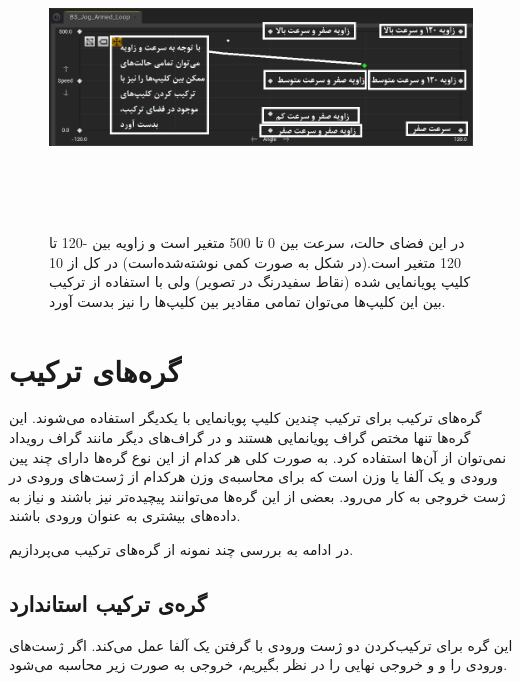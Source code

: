 \begin{figure}[ht]
	\centerline{\includegraphics[width=\textwidth,height=8cm,keepaspectratio]{Figures/Ch3/BlendSpace.png}}

	\caption{در این فضای حالت، سرعت بین 0 تا 500 متغیر است و زاویه بین -120 تا 120 متغیر است.(در شکل به صورت کمی نوشته‌شده‌است)
	در کل از 10 کلیپ پویانمایی شده (نقاط سفیدرنگ در تصویر) ولی با استفاده از ترکیب بین این کلیپ‌ها می‌توان تمامی مقادیر بین کلیپ‌ها را نیز بدست آورد. }
	\label{fig:BlendSpace}
\end{figure}


\section {گره‌های ترکیب}

گره‌های ترکیب برای ترکیب چندین کلیپ پویانمایی با یکدیگر استفاده‌ می‌شوند.
این گره‌‌ها تنها مختص گراف پویانمایی هستند و در گراف‌های دیگر مانند گراف رویداد 
نمی‌توان از آن‌ها استفاده کرد.
به صورت کلی هر کدام از این نوع گره‌ها دارای چند پین ورودی و 
یک آلفا یا وزن است که برای محاسبه‌ی 
وزن هرکدام از ژست‌های ورودی در ژست خروجی به کار می‌رود.
بعضی از این گره‌‌ها می‌توانند 
پیچیده‌تر نیز باشند و نیاز به داده‌های بیشتری به عنوان ورودی باشند.

در ادامه به بررسی چند نمونه از گره‌‌های ترکیب می‌پردازیم.

\subsection{ گره‌ی ترکیب استاندارد}

این گره برای ترکیب‌کردن دو ژست ورودی با گرفتن یک آلفا عمل می‌کند.
اگر ژست‌های ورودی را
و 
 و
خروجی نهایی را 
در نظر بگیریم، 
خروجی به صورت زیر محاسبه می‌شود.

